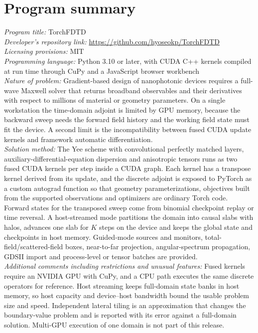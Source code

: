 \documentclass[11pt,a4paper]{article}
\begin{document}
\section*{Program summary}
\noindent\textit{Program title:} TorchFDTD\\
\textit{Developer's repository link:} \url{https://github.com/hyoseokp/TorchFDTD}\\
\textit{Licensing provisions:} MIT\\
\textit{Programming language:} Python 3.10 or later, with CUDA C++ kernels compiled at run time through CuPy and a JavaScript browser workbench\\
\textit{Nature of problem:} Gradient-based design of nanophotonic devices requires a full-wave Maxwell solver that returns broadband observables and their derivatives with respect to millions of material or geometry parameters. On a single workstation the time-domain adjoint is limited by GPU memory, because the backward sweep needs the forward field history and the working field state must fit the device. A second limit is the incompatibility between fused CUDA update kernels and framework automatic differentiation.\\
\textit{Solution method:} The Yee scheme with convolutional perfectly matched layers, auxiliary-differential-equation dispersion and anisotropic tensors runs as two fused CUDA kernels per step inside a CUDA graph. Each kernel has a transpose kernel derived from its update, and the discrete adjoint is exposed to PyTorch as a custom autograd function so that geometry parameterizations, objectives built from the supported observations and optimizers are ordinary Torch code. Forward states for the transposed sweep come from binomial checkpoint replay or time reversal. A host-streamed mode partitions the domain into causal slabs with halos, advances one slab for $K$ steps on the device and keeps the global state and checkpoints in host memory. Guided-mode sources and monitors, total-field/scattered-field boxes, near-to-far projection, angular-spectrum propagation, GDSII import and process-level or tensor batches are provided.\\
\textit{Additional comments including restrictions and unusual features:} Fused kernels require an NVIDIA GPU with CuPy, and a CPU path executes the same discrete operators for reference. Host streaming keeps full-domain state banks in host memory, so host capacity and device--host bandwidth bound the usable problem size and speed. Independent lateral tiling is an approximation that changes the boundary-value problem and is reported with its error against a full-domain solution. Multi-GPU execution of one domain is not part of this release.
\end{document}
